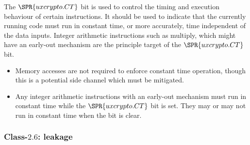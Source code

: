 The $\SPR{uxcrypto.CT}$ bit is used to control the timing and execution
behaviour of certain instructions.
It should be used to indicate that the currently running code must run
in constant time, or more accurately, time independent of the data
inputs.
Integer arithmetic instructions such as multiply, which might have an
early-out mechanism are the principle target of the $\SPR{uxcrypto.CT}$ bit.
\begin{itemize}
\item Memory accesses are not required to enforce constant time operation,
      though this is a potential side channel which must be mitigated.
\item Any integer arithmetic instructions with an early-out mechanism must
      run in constant time while the $\SPR{uxcrypto.CT}$ bit is set.
      They may or may not run in constant time when the bit is clear.
\end{itemize}


\subsubsection{Class-$2.6$: leakage}
\label{sec:spec:state:2:6}


